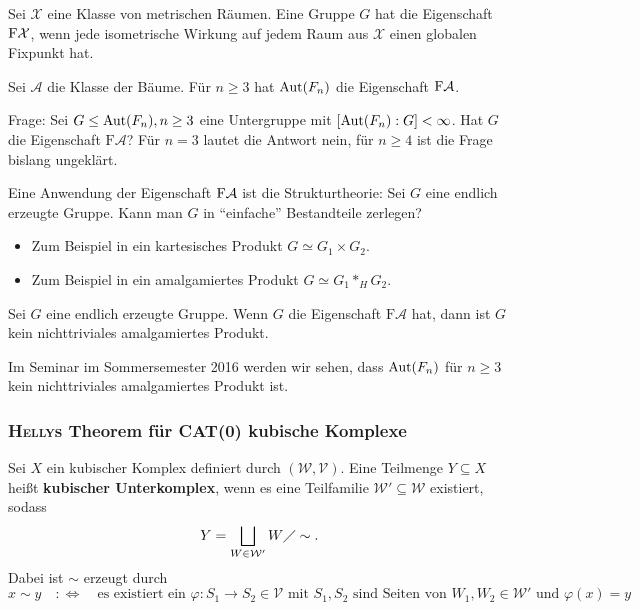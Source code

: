 \begin{definition}
\label{def:3.10}
	Sei  $\mathcal{X}$ eine Klasse von metrischen Räumen. 
	Eine Gruppe $G$ hat die Eigenschaft $\text{F}\mathcal{X}$, wenn jede isometrische Wirkung auf jedem Raum aus $\mathcal{X}$ einen globalen Fixpunkt hat.
\end{definition}

\begin{beispiel}
\label{bsp:3.11}
	Sei $\mathcal{A}$ die Klasse der Bäume.
	Für $n \geq 3$ hat $\operatorname{Aut}(F_n)$ die Eigenschaft $\text{F}\mathcal{A}$. 
\end{beispiel}

Frage:
Sei $G \leq \operatorname{Aut}(F_n), n \geq 3$ eine Untergruppe mit $[\operatorname{Aut}(F_n) : G] < \infty$.
Hat $G$ die Eigenschaft $\text{F}\mathcal{A}$?
Für $n = 3$ lautet die Antwort nein, für $n \geq 4$ ist die Frage bislang ungeklärt.

Eine Anwendung der Eigenschaft $\text{F}\mathcal{A}$ ist die Strukturtheorie:
Sei $G$ eine endlich erzeugte Gruppe.
Kann man $G$ in \enquote{einfache} Bestandteile zerlegen?
\begin{itemize}
	\item Zum Beispiel in ein kartesisches Produkt $G \simeq G_1 \times G_2$.
	\item Zum Beispiel in ein amalgamiertes Produkt $G \simeq G_1 *_H G_2$.
\end{itemize}

\begin{no-satz}
	Sei $G$ eine endlich erzeugte Gruppe.
	Wenn $G$ die Eigenschaft $\text{F}\mathcal{A}$ hat, dann ist $G$ kein nichttriviales amalgamiertes Produkt.
\end{no-satz}

Im Seminar im Sommersemester 2016 werden wir sehen, dass $\operatorname{Aut}(F_n)$ für $n \geq 3$ kein nichttriviales amalgamiertes Produkt ist.

\subsubsection{\textsc{Helly}s Theorem für CAT(0) kubische Komplexe}
\label{subsec:3.1.2}

\begin{definition}
\label{def:3.12}
	Sei $X$ ein kubischer Komplex definiert durch $(\mathcal{W},\mathcal{V})$.
	Eine Teilmenge $Y \subseteq X$ heißt \textbf{kubischer Unterkomplex}, wenn es eine Teilfamilie $\mathcal{W'} \subseteq \mathcal{W}$ existiert, sodass
	\[
		Y = \bigsqcup_{W \in \mathcal{W}'} W \diagup \sim.
	\]
	Dabei ist $\sim$ erzeugt durch
	\[
		x \sim y \quad :\Leftrightarrow \quad \text{es existiert ein } \varphi \colon S_1 \rightarrow S_2 \in \mathcal{V} \text{ mit } S_1,S_2 \text{ sind Seiten von } W_1,W_2 \in \mathcal{W'} \text{ und } \varphi(x) = y
	\]
\end{definition}

